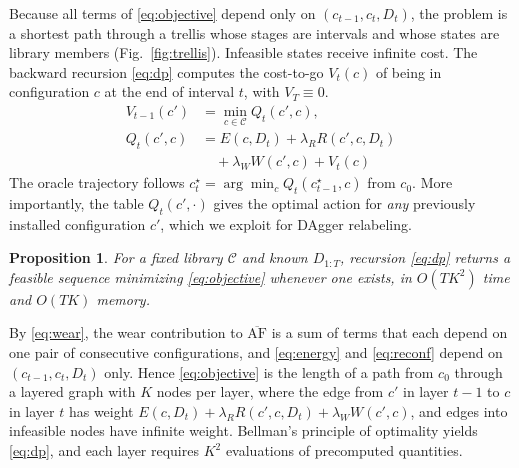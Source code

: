 \documentclass[journal]{IEEEtran}
\newtheorem{proposition}{Proposition}
\begin{document}
Because all terms of \eqref{eq:objective} depend only on $(c_{t-1},c_t,D_t)$, the problem is a shortest path through a trellis whose stages are intervals and whose states are library members (Fig.~\ref{fig:trellis}). Infeasible states receive infinite cost. The backward recursion \eqref{eq:dp} computes the cost-to-go $V_t(c)$ of being in configuration $c$ at the end of interval $t$, with $V_T\equiv 0$.
\begin{equation}\label{eq:dp}
\begin{aligned}V_{t-1}(c')&=\min_{c\in\mathcal{C}}Q_t(c',c),\\
Q_t(c',c)&=E(c,D_t)+\lambda_R R(c',c,D_t)\\
&\quad+\lambda_W W(c',c)+V_t(c)\end{aligned}
\end{equation}
The oracle trajectory follows $c^\star_t=\arg\min_c Q_t(c^\star_{t-1},c)$ from $c_0$. More importantly, the table $Q_t(c',\cdot)$ gives the optimal action for \emph{any} previously installed configuration $c'$, which we exploit for DAgger relabeling.

\begin{proposition}\label{prop:dp}
For a fixed library $\mathcal{C}$ and known $D_{1:T}$, recursion \eqref{eq:dp} returns a feasible sequence minimizing \eqref{eq:objective} whenever one exists, in $O(TK^2)$ time and $O(TK)$ memory.
\end{proposition}
\begin{IEEEproof}
By \eqref{eq:wear}, the wear contribution to $\overline{\mathrm{AF}}$ is a sum of terms that each depend on one pair of consecutive configurations, and \eqref{eq:energy} and \eqref{eq:reconf} depend on $(c_{t-1},c_t,D_t)$ only. Hence \eqref{eq:objective} is the length of a path from $c_0$ through a layered graph with $K$ nodes per layer, where the edge from $c'$ in layer $t-1$ to $c$ in layer $t$ has weight $E(c,D_t)+\lambda_R R(c',c,D_t)+\lambda_W W(c',c)$, and edges into infeasible nodes have infinite weight. Bellman's principle of optimality yields \eqref{eq:dp}, and each layer requires $K^2$ evaluations of precomputed quantities.
\end{IEEEproof}
\end{document}
